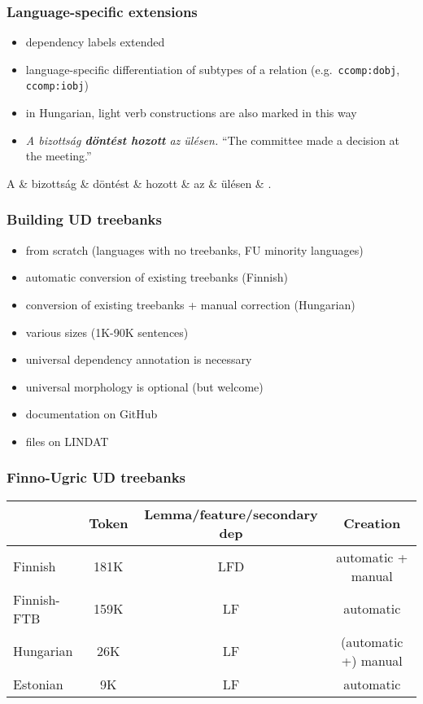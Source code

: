 \documentclass{beamer}
\begin{document}
\begin{frame}
\frametitle{Language-specific extensions}
\begin{itemize}
\item dependency labels extended
\item language-specific differentiation of subtypes of a relation (e.g.~\texttt{ccomp:dobj}, \texttt{ccomp:iobj})
\item in Hungarian, light verb constructions are also marked in this way
\item \emph{A bizotts\'ag \textbf{d\"ont\'est hozott} az \"ul\'esen.} ``The committee made a decision at the meeting.''

\end{itemize}

\begin{dependency}[theme = simple]
   \begin{deptext}[column sep=1em]
      A \& bizotts\'ag \& d\"ont\'est \& hozott \& az \& \"ul\'esen \& . \\
   \end{deptext}
\end{dependency}

\end{frame}

\begin{frame}
\frametitle{Building UD treebanks}
\begin{itemize}
\item from scratch (languages with no treebanks, FU minority languages)
\item automatic conversion of existing treebanks (Finnish)
\item conversion of existing treebanks + manual correction (Hungarian)
\item various sizes (1K-90K sentences)
\item universal dependency annotation is necessary
\item universal morphology is optional (but welcome)
\item documentation on GitHub
\item files on LINDAT
\end{itemize}
\end{frame}

\begin{frame}
\frametitle{Finno-Ugric UD treebanks}
\begin{table}
\centering
\footnotesize
	\begin{tabular}{lccc}
	& \textbf{Token} & \textbf{Lemma/feature/secondary dep} & \textbf{Creation}\\\hline
	Finnish & 181K & LFD & automatic + manual\\
	Finnish-FTB & 159K & LF & automatic\\
	Hungarian & 26K & LF & (automatic +) manual\\
	Estonian & 9K & LF & automatic\\
	\end{tabular}
	\label{tab:FU}
\end{table}
\end{frame}
\end{document}

